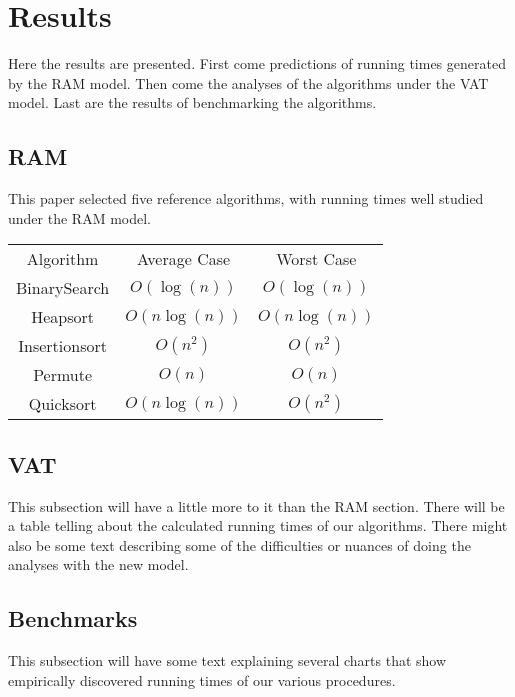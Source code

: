 \section{Results}

  Here the results are presented. First come predictions of running times
  generated by the RAM model. Then come the analyses of the algorithms under
  the VAT model. Last are the results of benchmarking the algorithms.

  \subsection{RAM}
    This paper selected five reference algorithms, with running times well 
    studied under the RAM model.
    
    \begin{tabular}{ccc}
      Algorithm     & Average Case  & Worst Case   \\
      BinarySearch  & $O(\log(n))$  & $O(\log(n))$ \\
      Heapsort      & $O(n\log(n))$ & $O(n\log(n))$\\
      Insertionsort & $O(n^2)$      & $O(n^2)$     \\
      Permute       & $O(n)$        & $O(n)$       \\
      Quicksort     & $O(n\log(n))$ & $O(n^2)$     \\
    \end{tabular}

  \subsection{VAT}
     This subsection will have a little more to it than the RAM section. There
     will be a table telling about the calculated running times of our 
     algorithms. There might also be some text describing some of the 
     difficulties or nuances of doing the analyses with the new model.

  \subsection{Benchmarks}
     This subsection will have some text explaining several charts that show
     empirically discovered running times of our various procedures.
